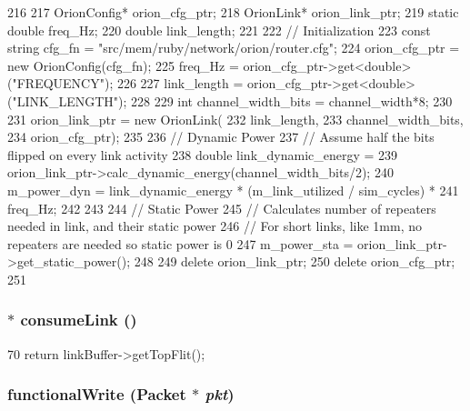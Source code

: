 \begin{DoxyCode}
216 {
217     OrionConfig* orion_cfg_ptr;
218     OrionLink* orion_link_ptr;
219     static double freq_Hz;
220     double link_length;
221 
222     // Initialization
223     const string cfg_fn = "src/mem/ruby/network/orion/router.cfg";
224     orion_cfg_ptr = new OrionConfig(cfg_fn);
225     freq_Hz = orion_cfg_ptr->get<double>("FREQUENCY");
226 
227     link_length = orion_cfg_ptr->get<double>("LINK_LENGTH");
228 
229     int channel_width_bits = channel_width*8;
230 
231     orion_link_ptr = new OrionLink(
232         link_length,
233         channel_width_bits,
234         orion_cfg_ptr);
235 
236     // Dynamic Power
237     // Assume half the bits flipped on every link activity
238     double link_dynamic_energy =
239         orion_link_ptr->calc_dynamic_energy(channel_width_bits/2);
240     m_power_dyn = link_dynamic_energy * (m_link_utilized  / sim_cycles) *
241                   freq_Hz;
242 
243 
244     // Static Power
245     // Calculates number of repeaters needed in link, and their static power
246     // For short links, like 1mm, no repeaters are needed so static power is 0
247     m_power_sta = orion_link_ptr->get_static_power();
248 
249     delete orion_link_ptr;
250     delete orion_cfg_ptr;
251 }
\end{DoxyCode}
\hypertarget{classNetworkLink__d_acc5b43c03ea5b36923b9bf8a38fcc6da}{
\subsubsection[{consumeLink}]{$\ast$ consumeLink ()}}
\label{classNetworkLink__d_acc5b43c03ea5b36923b9bf8a38fcc6da}



\begin{DoxyCode}
70 { return linkBuffer->getTopFlit(); }
\end{DoxyCode}
\hypertarget{classNetworkLink__d_aba9037f662122b5f2e85647d35670e5c}{
\subsubsection[{functionalWrite}]{ functionalWrite ({\bf Packet} $\ast$ {\em pkt})}}
\label{classNetworkLink__d_aba9037f662122b5f2e85647d35670e5c}




